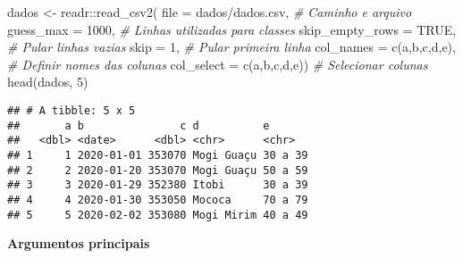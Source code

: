 \documentclass[
]{book}
\newenvironment{Shaded}{\begin{snugshade}}{\end{snugshade}}
\newcommand{\AttributeTok}[1]{\textcolor[rgb]{0.77,0.63,0.00}{#1}}
\newcommand{\CommentTok}[1]{\textcolor[rgb]{0.56,0.35,0.01}{\textit{#1}}}
\newcommand{\ConstantTok}[1]{\textcolor[rgb]{0.00,0.00,0.00}{#1}}
\newcommand{\DecValTok}[1]{\textcolor[rgb]{0.00,0.00,0.81}{#1}}
\newcommand{\FunctionTok}[1]{\textcolor[rgb]{0.00,0.00,0.00}{#1}}
\newcommand{\NormalTok}[1]{#1}
\newcommand{\OtherTok}[1]{\textcolor[rgb]{0.56,0.35,0.01}{#1}}
\newcommand{\SpecialCharTok}[1]{\textcolor[rgb]{0.00,0.00,0.00}{#1}}
\newcommand{\StringTok}[1]{\textcolor[rgb]{0.31,0.60,0.02}{#1}}
\theoremstyle{definition}
\theoremstyle{definition}
\theoremstyle{definition}
\theoremstyle{definition}
\theoremstyle{remark}
\begin{document}
\begin{Shaded}
\begin{Highlighting}[]
\NormalTok{dados }\OtherTok{\textless{}{-}}\NormalTok{ readr}\SpecialCharTok{::}\FunctionTok{read\_csv2}\NormalTok{(}
              \AttributeTok{file =} \StringTok{\textquotesingle{}dados/dados.csv\textquotesingle{}}\NormalTok{,   }\CommentTok{\# Caminho e arquivo}
              \AttributeTok{guess\_max =} \DecValTok{1000}\NormalTok{,           }\CommentTok{\# Linhas utilizadas para classes}
              \AttributeTok{skip\_empty\_rows =} \ConstantTok{TRUE}\NormalTok{,     }\CommentTok{\# Pular linhas vazias}
              \AttributeTok{skip =} \DecValTok{1}\NormalTok{,                   }\CommentTok{\# Pular primeira linha}
              \AttributeTok{col\_names =} \FunctionTok{c}\NormalTok{(}\StringTok{\textquotesingle{}a\textquotesingle{}}\NormalTok{,}\StringTok{\textquotesingle{}b\textquotesingle{}}\NormalTok{,}\StringTok{\textquotesingle{}c\textquotesingle{}}\NormalTok{,}\StringTok{\textquotesingle{}d\textquotesingle{}}\NormalTok{,}\StringTok{\textquotesingle{}e\textquotesingle{}}\NormalTok{),   }\CommentTok{\# Definir nomes das colunas}
              \AttributeTok{col\_select =} \FunctionTok{c}\NormalTok{(}\StringTok{\textquotesingle{}a\textquotesingle{}}\NormalTok{,}\StringTok{\textquotesingle{}b\textquotesingle{}}\NormalTok{,}\StringTok{\textquotesingle{}c\textquotesingle{}}\NormalTok{,}\StringTok{\textquotesingle{}d\textquotesingle{}}\NormalTok{,}\StringTok{\textquotesingle{}e\textquotesingle{}}\NormalTok{))  }\CommentTok{\# Selecionar colunas}
\FunctionTok{head}\NormalTok{(dados, }\DecValTok{5}\NormalTok{)}
\end{Highlighting}
\end{Shaded}

\begin{verbatim}
## # A tibble: 5 x 5
##       a b               c d          e      
##   <dbl> <date>      <dbl> <chr>      <chr>  
## 1     1 2020-01-01 353070 Mogi Guaçu 30 a 39
## 2     2 2020-01-20 353070 Mogi Guaçu 50 a 59
## 3     3 2020-01-29 352380 Itobi      30 a 39
## 4     4 2020-01-30 353050 Mococa     70 a 79
## 5     5 2020-02-02 353080 Mogi Mirim 40 a 49
\end{verbatim}

\textbf{Argumentos principais}
\end{document}
